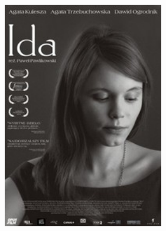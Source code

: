 \documentclass[12pt]{amsart}
\begin{document}
\begin{multicols}{2}
\begingroup 
\centering  

\includegraphics[width=7cm]{ida.jpg}

\endgroup


\end{multicols}
\end{document}
